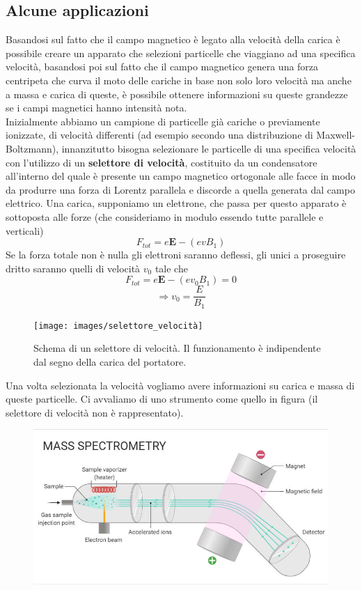 \documentclass[
10pt, %
a4paper, %
oneside, %
headinclude,footinclude, %
BCOR5mm, %
]{scrartcl}
\begin{document}
\subsection{Alcune applicazioni}
\begin{applicazione}
Basandosi sul fatto che il campo magnetico è legato alla velocità della carica è possibile creare un apparato che selezioni particelle che viaggiano ad una specifica velocità, basandosi poi sul fatto che il campo magnetico genera una forza centripeta che curva il moto delle cariche in base non solo loro velocità ma anche a massa e carica di queste, è possibile ottenere informazioni su queste grandezze se i campi magnetici hanno intensità nota.\\
Inizialmente abbiamo un campione di particelle già cariche o previamente ionizzate, di velocità differenti (ad esempio secondo una distribuzione di Maxwell-Boltzmann), innanzitutto bisogna selezionare le particelle di una specifica velocità con l'utilizzo di un \textbf{selettore di velocità}, costituito da un condensatore all'interno del quale è presente un campo magnetico ortogonale alle facce in modo da produrre una forza di Lorentz  parallela e discorde a quella generata dal campo elettrico. Una carica, supponiamo un elettrone, che passa per questo apparato è sottoposta alle forze (che consideriamo in modulo essendo tutte parallele e verticali)
\[F_{tot} = e\mathbf{E}-(evB_1)\]
Se la forza totale non è nulla gli elettroni saranno deflessi, gli unici a proseguire dritto saranno quelli di velocità \(v_0\) tale che
\[F_{tot}= e\mathbf{E}-(ev_0B_1)=0\]
\[\Rightarrow v_0=\frac{E}{B_1}\]
\begin{figure}[h!]
	\centering
	\texttt{[image: images/selettore\_velocità]}
	\caption{Schema di un selettore di velocità. Il funzionamento è indipendente dal segno della carica del portatore.}
	\label{fig:selettorevelocita}
\end{figure}
\FloatBarrier
Una volta selezionata la velocità vogliamo avere informazioni su carica e massa di queste particelle. Ci avvaliamo di uno strumento come quello in figura (il selettore di velocità non è rappresentato).
\begin{figure}[h!]
	\centering
	\includegraphics[width=0.7\linewidth]{images/spettrometro}

\end{figure}
\end{applicazione}
\end{document}
